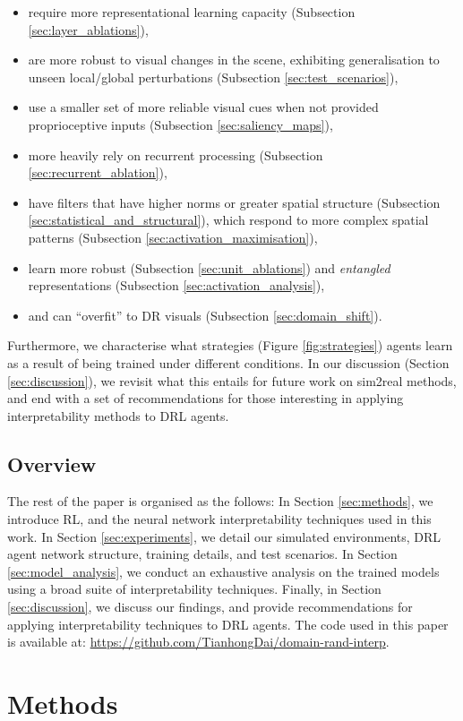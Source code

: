 \begin{itemize}
\item require more representational learning capacity (Subsection \ref{sec:layer_ablations}),
\item are more robust to visual changes in the scene, exhibiting generalisation to unseen local/global perturbations (Subsection \ref{sec:test_scenarios}),
\item use a smaller set of more reliable visual cues when not provided proprioceptive inputs (Subsection \ref{sec:saliency_maps}),
\item more heavily rely on recurrent processing (Subsection \ref{sec:recurrent_ablation}),
\item have filters that have higher norms or greater spatial structure (Subsection \ref{sec:statistical_and_structural}), which respond to more complex spatial patterns (Subsection \ref{sec:activation_maximisation}),
\item learn more robust (Subsection \ref{sec:unit_ablations}) and \textit{entangled} \cite{frosst2019analyzing} representations (Subsection \ref{sec:activation_analysis}),
\item and can ``overfit'' to DR visuals (Subsection \ref{sec:domain_shift}).
\end{itemize}

Furthermore, we characterise what strategies (Figure
\ref{fig:strategies}) agents learn as a result of being trained under
different conditions. In our discussion (Section \ref{sec:discussion}),
we revisit what this entails for future work on sim2real methods, and
end with a set of recommendations for those interesting in applying
interpretability methods to DRL agents.

\hypertarget{overview}{%
\subsection{Overview}\label{overview}}

The rest of the paper is organised as the follows: In Section
\ref{sec:methods}, we introduce RL, and the neural network
interpretability techniques used in this work. In Section
\ref{sec:experiments}, we detail our simulated environments, DRL agent
network structure, training details, and test scenarios. In Section
\ref{sec:model_analysis}, we conduct an exhaustive analysis on the
trained models using a broad suite of interpretability techniques.
Finally, in Section \ref{sec:discussion}, we discuss our findings, and
provide recommendations for applying interpretability techniques to DRL
agents. The code used in this paper is available at:
\url{https://github.com/TianhongDai/domain-rand-interp}.
\hypertarget{methods}{%
\section{Methods}\label{methods}}
\label{sec:methods}

